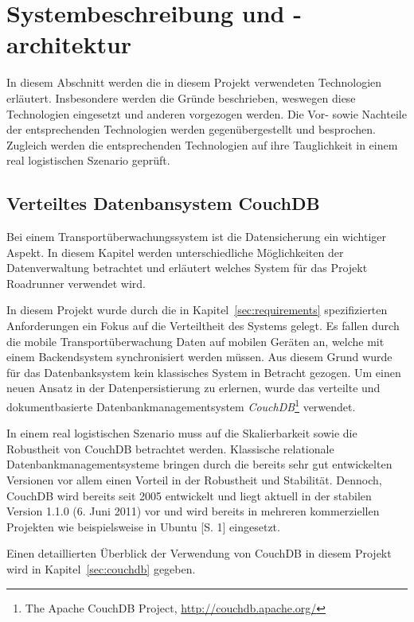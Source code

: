 \section{Systembeschreibung und -architektur}
\label{sec:system}

In diesem Abschnitt werden die in diesem Projekt verwendeten Technologien
	erläutert. Insbesondere werden die Gründe beschrieben, weswegen diese
	Technologien eingesetzt und anderen vorgezogen werden. Die Vor- sowie
	Nachteile der entsprechenden Technologien werden gegenübergestellt und
	besprochen. Zugleich werden die entsprechenden Technologien auf ihre
	Tauglichkeit in einem real logistischen Szenario geprüft.
	
\subsection{Verteiltes Datenbansystem CouchDB}
\label{subsec:couchdb}

Bei einem Transportüberwachungssystem ist die Datensicherung ein
	wichtiger Aspekt. In diesem Kapitel werden unterschiedliche 
	Möglichkeiten der Datenverwaltung betrachtet und erläutert welches
	System für das Projekt Roadrunner verwendet wird.

In diesem Projekt wurde durch die in Kapitel~\ref{sec:requirements} spezifizierten
	Anforderungen ein Fokus auf die Verteiltheit des Systems gelegt. Es fallen
	durch die mobile Transportüberwachung Daten auf mobilen Geräten an, welche
	mit einem Backendsystem synchronisiert werden müssen. Aus diesem Grund wurde
	für das Datenbanksystem kein klassisches System in Betracht gezogen. Um einen
	neuen Ansatz in der Datenpersistierung zu erlernen, wurde das verteilte
	und dokumentbasierte Datenbankmanagementsystem \emph{CouchDB}\footnote{The
	Apache CouchDB Project, \url{http://couchdb.apache.org/}} verwendet.

In einem real logistischen Szenario muss auf die Skalierbarkeit sowie die
	Robustheit von CouchDB betrachtet werden. Klassische relationale
	Datenbankmanagementsysteme bringen durch die bereits sehr gut entwickelten
	Versionen vor allem einen Vorteil in der Robustheit und Stabilität. Dennoch,
	CouchDB wird bereits seit 2005 entwickelt und liegt aktuell in der stabilen
	Version 1.1.0 (6. Juni 2011) vor und wird bereits in mehreren kommerziellen
	Projekten wie beispielsweise in Ubuntu \cite{Murphy09}[S. 1] eingesetzt.

Einen detaillierten Überblick der Verwendung von CouchDB in diesem Projekt
	wird in Kapitel~\ref{sec:couchdb} gegeben.

